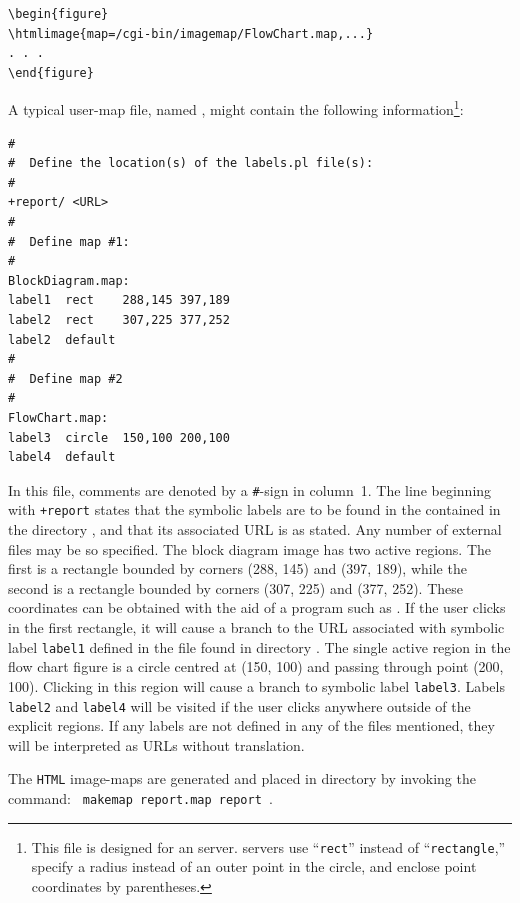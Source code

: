 \begin{changebar}
\begin{small}
\begin{verbatim}
\begin{figure}
\htmlimage{map=/cgi-bin/imagemap/FlowChart.map,...}
. . .
\end{figure}
\end{verbatim}
\end{small}

\medskip\htmlrule[50\% center]
%
%
\html{\\}%
\noindent
A typical user-map file, named , 
might contain the following information\footnote{%
This file is designed for an  server.  
 servers use ``\texttt{rect}''
instead of ``\texttt{rectangle},'' 
specify a radius instead of an outer point in the circle, 
and enclose point coordinates by parentheses.}:
\begin{small}
\begin{verbatim}
#
#  Define the location(s) of the labels.pl file(s):
#
+report/ <URL>
#
#  Define map #1:
#
BlockDiagram.map:       
label1  rect    288,145 397,189
label2  rect    307,225 377,252
label2  default
#
#  Define map #2
#
FlowChart.map:
label3  circle  150,100 200,100
label4  default
\end{verbatim}
\end{small}
\html{\\}%
In this file, comments are denoted by a \texttt{\#}-sign in column~1.
The line beginning with \verb|+report| states that the symbolic labels
are to be found in the  contained in the directory
, and that its associated URL is as stated.  Any number
of external  files may be so specified.
The block diagram image has two active regions.  The first is a rectangle
bounded by corners (288, 145) and (397, 189), while the second is a rectangle
bounded by corners (307, 225) and (377, 252).  These coordinates
can be obtained with the aid of a program such as .
If the user clicks in the first rectangle, 
it will cause a branch to the URL associated
with symbolic label \texttt{label1} defined in the  file
found in directory .  The single active region in the
flow chart figure is a circle centred at (150, 100) and passing through
point (200, 100).  Clicking in this region will cause a branch to
symbolic label \texttt{label3}.  Labels \texttt{label2} and \texttt{label4}
will be visited if the user clicks anywhere outside of the explicit
regions.  If any labels are not defined in any of the 
files mentioned, they will be interpreted as URLs without translation.

The \texttt{HTML} image-maps are generated and placed in directory
 by invoking the command: \verb| makemap report.map report |.%
\end{changebar}\par
{}




